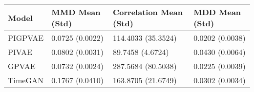 \begin{tabular}{llll}
\toprule
Model & MMD Mean (Std) & Correlation Mean (Std) & MDD Mean (Std) \\
\midrule
PIGPVAE & 0.0725 (0.0022) & 114.4033 (35.3524) & 0.0202 (0.0038) \\
PIVAE & 0.0802 (0.0031) & 89.7458 (4.6724) & 0.0430 (0.0064) \\
GPVAE & 0.0732 (0.0024) & 287.5684 (80.5038) & 0.0225 (0.0039) \\
TimeGAN & 0.1767 (0.0410) & 163.8705 (21.6749) & 0.0302 (0.0034) \\
\bottomrule
\end{tabular}
